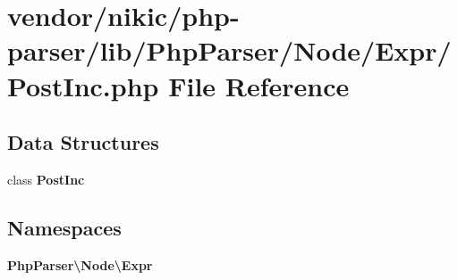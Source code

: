\section{vendor/nikic/php-\/parser/lib/\+Php\+Parser/\+Node/\+Expr/\+Post\+Inc.php File Reference}
\label{_post_inc_8php}
\subsection*{Data Structures}
\begin{DoxyCompactItemize}
\item 
class {\bf Post\+Inc}
\end{DoxyCompactItemize}
\subsection*{Namespaces}
\begin{DoxyCompactItemize}
\item 
 {\bf Php\+Parser\textbackslash{}\+Node\textbackslash{}\+Expr}
\end{DoxyCompactItemize}
